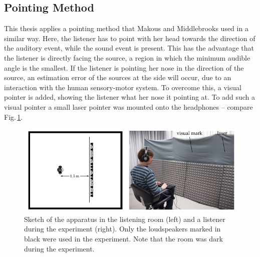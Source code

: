 \subsection{Pointing Method}
\label{sec:pointing_method}

This thesis applies a pointing method that  Makous and
Middlebrooks\autocite{Makous1990} used in a similar way.
Here, the listener has to point with her head towards
the direction of the auditory event,
while the sound event is present.
This has the advantage that the listener is directly facing the source, a region
in which the minimum audible angle is the smallest.\autocite{Mills1958}
If the listener is pointing her nose in the direction of the source, an
estimation error of the sources at the side will occur, due to an interaction
with the human sensory-motor system. To overcome this, a visual pointer is
added, showing the
listener what her nose it pointing at.\autocite{Lewald2000}
To add such a visual pointer a small laser pointer was mounted onto the
headphones -- compare Fig.\,\ref{fig:apparatus}.

\begin{figure}[t]
    \includegraphics{fig4_03/fig4_03}
    \caption{Sketch of the apparatus in the listening room (left) and a listener
    during the experiment (right). Only the loudspeakers marked in black were
    used in the experiment. Note that the room was dark during
    the experiment.
    }
    \label{fig:apparatus}
\end{figure}

